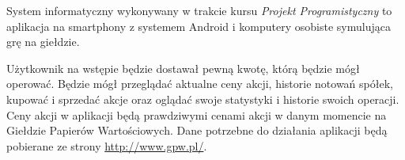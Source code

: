 System informatyczny wykonywany w trakcie kursu \emph{Projekt Programistyczny} to aplikacja na smartphony
z systemem Android i komputery osobiste symulująca grę na giełdzie. 

Użytkownik na wstępie będzie dostawał pewną kwotę, którą będzie mógł operować. Będzie mógł przeglądać
aktualne ceny akcji, historie notowań spółek, kupować i sprzedać akcje oraz oglądać swoje statystyki
i historie swoich operacji. Ceny akcji w aplikacji będą prawdziwymi cenami akcji w danym momencie na
Giełdzie Papierów Wartościowych. Dane potrzebne do działania aplikacji będą pobierane ze strony 
\url{http://www.gpw.pl/}.

